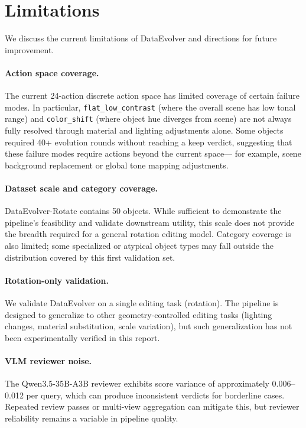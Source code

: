 \section{Limitations}
\label{sec:limitations}

We discuss the current limitations of DataEvolver and directions for future improvement.

\paragraph{Action space coverage.}
The current 24-action discrete action space has limited coverage of certain failure modes.
In particular, \texttt{flat\_low\_contrast} (where the overall scene has low tonal range)
and \texttt{color\_shift} (where object hue diverges from scene) are not always fully resolved
through material and lighting adjustments alone.
Some objects required 40+ evolution rounds without reaching a keep verdict,
suggesting that these failure modes require actions beyond the current space---
for example, scene background replacement or global tone mapping adjustments.

\paragraph{Dataset scale and category coverage.}
DataEvolver-Rotate contains 50 objects.
While sufficient to demonstrate the pipeline's feasibility and validate downstream utility,
this scale does not provide the breadth required for a general rotation editing model.
Category coverage is also limited; some specialized or atypical object types
may fall outside the distribution covered by this first validation set.

\paragraph{Rotation-only validation.}
We validate DataEvolver on a single editing task (rotation).
The pipeline is designed to generalize to other geometry-controlled editing tasks
(lighting changes, material substitution, scale variation),
but such generalization has not been experimentally verified in this report.

\paragraph{VLM reviewer noise.}
The Qwen3.5-35B-A3B reviewer exhibits score variance of approximately 0.006--0.012 per query,
which can produce inconsistent verdicts for borderline cases.
Repeated review passes or multi-view aggregation can mitigate this,
but reviewer reliability remains a variable in pipeline quality.

